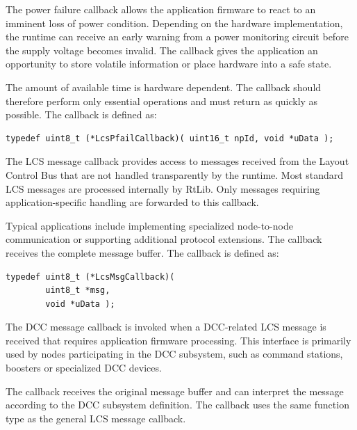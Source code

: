 
The power failure callback allows the application firmware to react to an imminent
loss of power condition. Depending on the hardware implementation, the runtime can
receive an early warning from a power monitoring circuit before the supply voltage
becomes invalid. The callback gives the application an opportunity to store volatile
information or place hardware into a safe state.

The amount of available time is hardware dependent. The callback should therefore
perform only essential operations and must return as quickly as possible. The 
callback is defined as:

\begin{lstlisting}[language=RtLib, style=api-interface]
typedef uint8_t (*LcsPfailCallback)( uint16_t npId, void *uData );
\end{lstlisting}


The LCS message callback provides access to messages received from the Layout 
Control Bus that are not handled transparently by the runtime. Most standard LCS 
messages are processed internally by RtLib. Only messages requiring 
application-specific handling are forwarded to this callback.

Typical applications include implementing specialized node-to-node communication 
or supporting additional protocol extensions. The callback receives the complete 
message buffer. The callback is defined as:

\begin{lstlisting}[style=api-interface]
typedef uint8_t (*LcsMsgCallback)(
        uint8_t *msg,
        void *uData );
\end{lstlisting}



The DCC message callback is invoked when a DCC-related LCS message is received 
that requires application firmware processing. This interface is primarily used 
by nodes participating in the DCC subsystem, such as command stations, boosters 
or specialized DCC devices.

The callback receives the original message buffer and can interpret the message
according to the DCC subsystem definition. The callback uses the same function 
type as the general LCS message callback.

